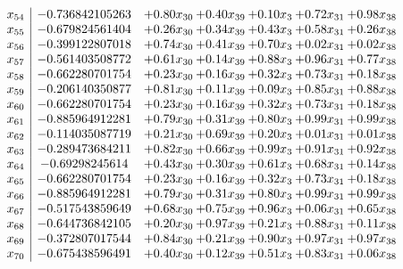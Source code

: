\documentclass[8pt]{article}
\begin{document}
\[\begin{array}{c| c c@{\hskip 2pt} c@{\hskip 2pt} c@{\hskip 2pt} c@{\hskip 2pt} c@{\hskip 2pt} }
 x_{54}   &  -0.736842105263 & +  0.80 x_{30} & +  0.40 x_{39} & +  0.10 x_{3} & +  0.72 x_{31} & +  0.98 x_{38}\\
 x_{55}   &  -0.679824561404 & +  0.26 x_{30} & +  0.34 x_{39} & +  0.43 x_{3} & +  0.58 x_{31} & +  0.26 x_{38}\\
 x_{56}   &  -0.399122807018 & +  0.74 x_{30} & +  0.41 x_{39} & +  0.70 x_{3} & +  0.02 x_{31} & +  0.02 x_{38}\\
 x_{57}   &  -0.561403508772 & +  0.61 x_{30} & +  0.14 x_{39} & +  0.88 x_{3} & +  0.96 x_{31} & +  0.77 x_{38}\\
 x_{58}   &  -0.662280701754 & +  0.23 x_{30} & +  0.16 x_{39} & +  0.32 x_{3} & +  0.73 x_{31} & +  0.18 x_{38}\\
 x_{59}   &  -0.206140350877 & +  0.81 x_{30} & +  0.11 x_{39} & +  0.09 x_{3} & +  0.85 x_{31} & +  0.88 x_{38}\\
 x_{60}   &  -0.662280701754 & +  0.23 x_{30} & +  0.16 x_{39} & +  0.32 x_{3} & +  0.73 x_{31} & +  0.18 x_{38}\\
 x_{61}   &  -0.885964912281 & +  0.79 x_{30} & +  0.31 x_{39} & +  0.80 x_{3} & +  0.99 x_{31} & +  0.99 x_{38}\\
 x_{62}   &  -0.114035087719 & +  0.21 x_{30} & +  0.69 x_{39} & +  0.20 x_{3} & +  0.01 x_{31} & +  0.01 x_{38}\\
 x_{63}   &  -0.289473684211 & +  0.82 x_{30} & +  0.66 x_{39} & +  0.99 x_{3} & +  0.91 x_{31} & +  0.92 x_{38}\\
 x_{64}   &  -0.69298245614 & +  0.43 x_{30} & +  0.30 x_{39} & +  0.61 x_{3} & +  0.68 x_{31} & +  0.14 x_{38}\\
 x_{65}   &  -0.662280701754 & +  0.23 x_{30} & +  0.16 x_{39} & +  0.32 x_{3} & +  0.73 x_{31} & +  0.18 x_{38}\\
 x_{66}   &  -0.885964912281 & +  0.79 x_{30} & +  0.31 x_{39} & +  0.80 x_{3} & +  0.99 x_{31} & +  0.99 x_{38}\\
 x_{67}   &  -0.517543859649 & +  0.68 x_{30} & +  0.75 x_{39} & +  0.96 x_{3} & +  0.06 x_{31} & +  0.65 x_{38}\\
 x_{68}   &  -0.644736842105 & +  0.20 x_{30} & +  0.97 x_{39} & +  0.21 x_{3} & +  0.88 x_{31} & +  0.11 x_{38}\\
 x_{69}   &  -0.372807017544 & +  0.84 x_{30} & +  0.21 x_{39} & +  0.90 x_{3} & +  0.97 x_{31} & +  0.97 x_{38}\\
 x_{70}   &  -0.675438596491 & +  0.40 x_{30} & +  0.12 x_{39} & +  0.51 x_{3} & +  0.83 x_{31} & +  0.06 x_{38}\\

\end{array}\]
\end{document}

